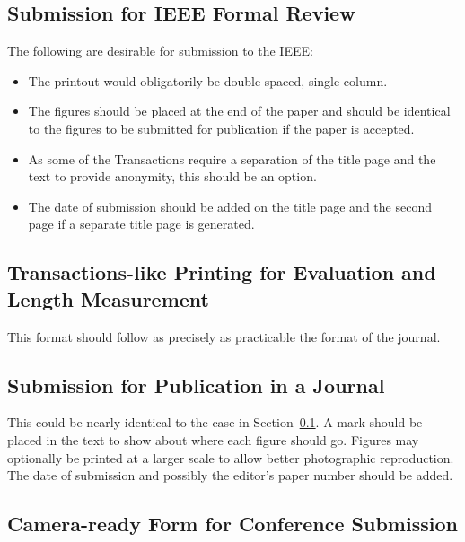 \documentclass[%
	final,
	notitlepage,
	narroweqnarray,
	inline,
	twoside,
	]{ieee}
\begin{document}
\subsection{Submission for IEEE Formal Review}
\label{sec:review}

The following are desirable for submission to the IEEE:
\begin{itemize}
\item The printout would obligatorily be double-spaced, single-column.  
\item The figures should be placed at the end of the paper and should
      be identical to the figures to be submitted for publication if
      the paper is accepted.
\item As some of the Transactions require a separation of the title
      page and the text to provide anonymity, this should be an
      option. 
\item The date of submission should be added on the title page 
      and the second page if a separate title page is generated.
\end{itemize}

\subsection{Transactions-like Printing for Evaluation and Length
Measurement}

This format should follow as precisely as practicable the format of the 
journal.

\subsection{Submission for Publication in a Journal}

This could be nearly identical to the case in
Section~\ref{sec:review}.  A mark should be placed in the text to show
about where each figure should go.  Figures may optionally be printed
at a larger scale to allow better photographic reproduction.  The date
of submission and possibly the editor's paper number should be added.

\subsection{Camera-ready Form for Conference Submission}
\end{document}
